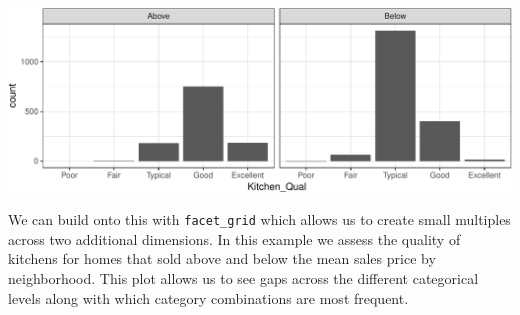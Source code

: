 \documentclass[]{article}
\newenvironment{Shaded}{\begin{snugshade}}{\end{snugshade}}
\newcommand{\KeywordTok}[1]{\textcolor[rgb]{0.13,0.29,0.53}{\textbf{#1}}}
\newcommand{\DataTypeTok}[1]{\textcolor[rgb]{0.13,0.29,0.53}{#1}}
\newcommand{\StringTok}[1]{\textcolor[rgb]{0.31,0.60,0.02}{#1}}
\newcommand{\OperatorTok}[1]{\textcolor[rgb]{0.81,0.36,0.00}{\textbf{#1}}}
\newcommand{\NormalTok}[1]{#1}
\begin{document}
\begin{Shaded}
\end{Shaded}

\begin{center}\includegraphics{Chapter_3_-_Visualization_files/figure-latex/facetw_bar-1} \end{center}

We can build onto this with \texttt{facet\_grid} which allows us to
create small multiples across two additional dimensions. In this example
we assess the quality of kitchens for homes that sold above and below
the mean sales price by neighborhood. This plot allows us to see gaps
across the different categorical levels along with which category
combinations are most frequent.
\end{document}
